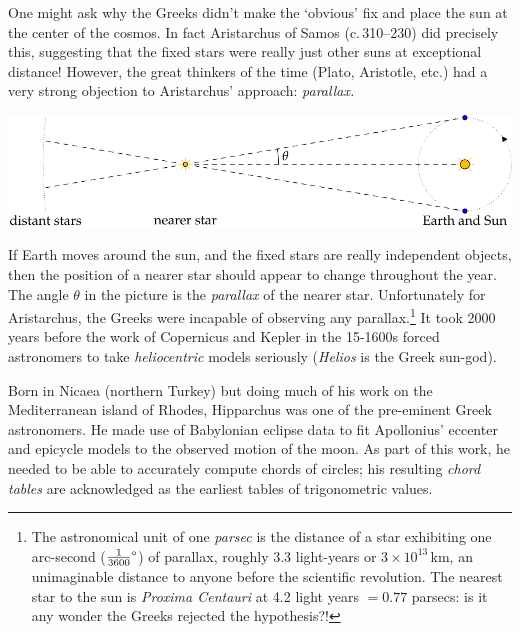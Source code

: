 One might ask why the Greeks didn't make the `obvious' fix and place the sun at the center of the cosmos. In fact Aristarchus of Samos (c.\,310--230\BC) did precisely this, suggesting that the fixed stars were really just other suns at exceptional distance! However, the great thinkers of the time (Plato, Aristotle, etc.) had a very strong objection to Aristarchus' approach: \emph{parallax.}
\begin{center}
\includegraphics{trig-parallax}
\end{center}
If Earth moves around the sun, and the fixed stars are really independent objects, then the position of a nearer star should appear to change throughout the year. The angle $\theta$ in the picture is the \emph{parallax} of the nearer star. Unfortunately for Aristarchus, the Greeks were incapable of observing any parallax.\footnote{The astronomical unit of one \emph{parsec} is the distance of a star exhibiting one arc-second ($\ang{\frac 1{3600}}$) of parallax, roughly 3.3 light-years or $3\times 10^{13}$\,km, an unimaginable distance to anyone before the scientific revolution. The nearest star to the sun is \emph{Proxima Centauri} at 4.2 light years $=0.77$ parsecs: is it any wonder the Greeks rejected the hypothesis?!}
It took 2000 years before the work of Copernicus and Kepler in the 15-1600s forced astronomers to take \emph{heliocentric} models seriously (\emph{Helios} is the Greek sun-god).
\goodbreak



Born in Nicaea (northern Turkey) but doing much of his work on the Mediterranean island of Rhodes, Hipparchus was one of the pre-eminent Greek astronomers. He made use of Babylonian eclipse data to fit Apollonius' eccenter and epicycle models to the observed motion of the moon. As part of this work, he needed to be able to accurately compute chords of circles; his resulting \emph{chord tables} are acknowledged as the earliest tables of trigonometric values.\par

